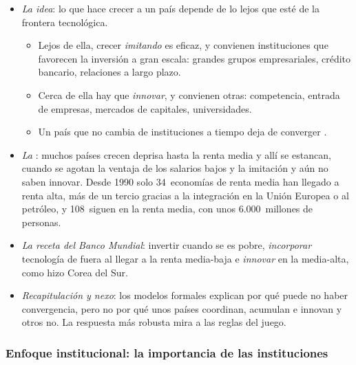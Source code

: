 \documentclass[11pt]{article}
\begin{document}
\begin{itemize}
\item \emph{La idea}: lo que hace crecer a un país depende de lo lejos que esté de la frontera tecnológica\nocite{AcemogluAghionZilibotti2006}.
  \begin{itemize}
  \item Lejos de ella, crecer \emph{imitando} es eficaz, y convienen instituciones que favorecen la inversión a gran escala: grandes grupos empresariales, crédito bancario, relaciones a largo plazo.
  \item Cerca de ella hay que \emph{innovar}, y convienen otras: competencia, entrada de empresas, mercados de capitales, universidades.
  \item Un país que no cambia de instituciones a tiempo deja de converger .
  \end{itemize}
\item \emph{La }\nocite{GillKharas2007East}: muchos países crecen deprisa hasta la renta media y allí se estancan, cuando se agotan la ventaja de los salarios bajos y la imitación y aún no saben innovar. Desde 1990 solo 34~economías de renta media han llegado a renta alta, más de un tercio gracias a la integración en la Unión Europea o al petróleo, y 108~siguen en la renta media, con unos 6.000~millones de personas\nocite{BM2024Informe}.
\item \emph{La receta del Banco Mundial}: invertir cuando se es pobre, \emph{incorporar} tecnología de fuera al llegar a la renta media-baja e \emph{innovar} en la media-alta, como hizo Corea del Sur\nocite{BM2024Informe}.
\item \emph{Recapitulación y nexo}: los modelos formales explican por qué puede no haber convergencia, pero no por qué unos países coordinan, acumulan e innovan y otros no. La respuesta más robusta mira a las reglas del juego.
\end{itemize}

\subsubsection{Enfoque institucional: la importancia de las instituciones}\label{sec:institucional}
\end{document}
